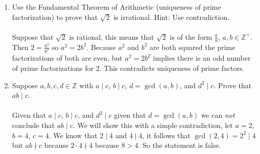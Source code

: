 \documentclass[class=article, crop=false]{standalone}
\def\integers{{\mathbb Z}}
\begin{document}
\begin{enumerate}[1.]
	\item Use the Fundamental Theorem of Arithmetic (uniqueness of prime factorization) to prove
	that $\sqrt{2}$ is irrational. Hint: Use contradiction. \\\\
	Suppose that $\sqrt{2}$ is rational, this means that $\sqrt{2}$ is of the form $\frac{a}{b}$, $a,b\in\integers^+$.
	Then $2=\frac{a^2}{b^2}$ so $a^2=2b^2$. Because $a^2$ and $b^2$ are both squared the prime factorizations
	of both are even, but $a^2=2b^2$ implies there is an odd number of prime factorizations for $2$. This contradicts
	uniqueness of prime factors.

	\item Suppose $a,b,c,d\in\integers$ with $a\mid c$, $b\mid c$, $d=\gcd(a,b)$, and $d^2\mid c$.
	Prove that $ab\mid c$.\\\\
	Given that $a\mid c$, $b\mid c$, and $d^2\mid c$ given that $d=\gcd(a,b)$ we can \emph{not} conclude
	that $ab\mid c$. We will show this with a simple contradiction, let $a=2$, $b=4$, $c=4$.
	We know that $2\mid 4$ and $4\mid 4$, it follows that $\gcd(2,4)=2^2\mid 4$ but 
	$ab\nmid c$ because $2\cdot 4\nmid 4$ because $8>4$. So the statement is false.

\end{enumerate}

\end{document}
